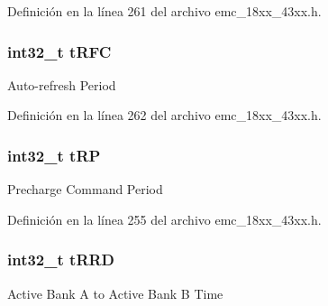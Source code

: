 Definición en la línea 261 del archivo emc\+\_\+18xx\+\_\+43xx.\+h.

\subsubsection[{\texorpdfstring{t\+R\+FC}{tRFC}}]{\setlength{\rightskip}{0pt plus 5cm}int32\+\_\+t t\+R\+FC}\hypertarget{struct_i_p___e_m_c___d_y_n___c_o_n_f_i_g___t_a03de5aced816218caee3e8dcaf8a42ef}{}\label{struct_i_p___e_m_c___d_y_n___c_o_n_f_i_g___t_a03de5aced816218caee3e8dcaf8a42ef}
Auto-\/refresh Period 

Definición en la línea 262 del archivo emc\+\_\+18xx\+\_\+43xx.\+h.

\subsubsection[{\texorpdfstring{t\+RP}{tRP}}]{\setlength{\rightskip}{0pt plus 5cm}int32\+\_\+t t\+RP}\hypertarget{struct_i_p___e_m_c___d_y_n___c_o_n_f_i_g___t_a26d402aa7f6438e5ce124d1c4aa6db90}{}\label{struct_i_p___e_m_c___d_y_n___c_o_n_f_i_g___t_a26d402aa7f6438e5ce124d1c4aa6db90}
Precharge Command Period 

Definición en la línea 255 del archivo emc\+\_\+18xx\+\_\+43xx.\+h.

\subsubsection[{\texorpdfstring{t\+R\+RD}{tRRD}}]{\setlength{\rightskip}{0pt plus 5cm}int32\+\_\+t t\+R\+RD}\hypertarget{struct_i_p___e_m_c___d_y_n___c_o_n_f_i_g___t_a6b842094338ef3f052cedc04b0b68ae7}{}\label{struct_i_p___e_m_c___d_y_n___c_o_n_f_i_g___t_a6b842094338ef3f052cedc04b0b68ae7}
Active Bank A to Active Bank B Time 

